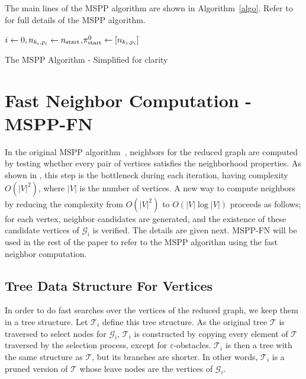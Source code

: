 \documentclass[letterpaper, 10 pt, conference]{ieeeconf}
\theoremstyle{definition}
\begin{document}
The main lines of the MSPP algorithm are shown in Algorithm~\ref{algo}. Refer to \cite{hauer2015multi} for full details of the MSPP algorithm.

\begin{algorithm}[ht]
 $i\gets 0,n_{k_i,p_i}\gets n_{{\rm start}}$,$\pi_{{\rm start}}^0\gets [n_{k_i,p_i}]$\;
 \caption{The MSPP Algorithm - Simplified for clarity}
 \label{algo}
\end{algorithm}

\section{Fast Neighbor Computation - MSPP-FN}

In the original MSPP algorithm~\cite{hauer2015multi}, neighbors for the reduced graph are computed by testing whether every pair of vertices satisfies the neighborhood properties.
As shown in \cite{hauer2015multi}, this step is the bottleneck during each iteration, having complexity $O(\vert V\vert ^2)$,
where $\vert V\vert$ is the number of vertices.
A new way to compute neighbors by reducing the complexity from $O(\vert V\vert^2)$ to $O(\vert V\vert\log \vert V\vert)$ proceeds as follows; for each vertex, neighbor candidates are generated, and the existence of these candidate vertices of $\mathcal{G}_i$ is verified. The details are given next. MSPP-FN will be used in the rest of the paper to refer to the MSPP algorithm using the fast neighbor computation.

\subsection{Tree Data Structure For Vertices}

In order to do fast searches over the vertices of the reduced graph, we keep them in a tree structure.
Let $\mathcal{T}_i$ define this tree structure.
As the original tree $\mathcal{T}$ is traversed to select nodes for $\mathcal{G}_i$, $\mathcal{T}_i$ is constructed by copying every element of $\mathcal{T}$ traversed by the selection process, except for $\varepsilon$-obstacles.
$\mathcal{T}_i$ is then a tree with the same structure as $\mathcal{T}$, but its branches are shorter.
In other words, $\mathcal{T}_i$ is a pruned version of $\mathcal{T}$ whose leave nodes are the vertices of $\mathcal{G}_i$.
\end{document}

